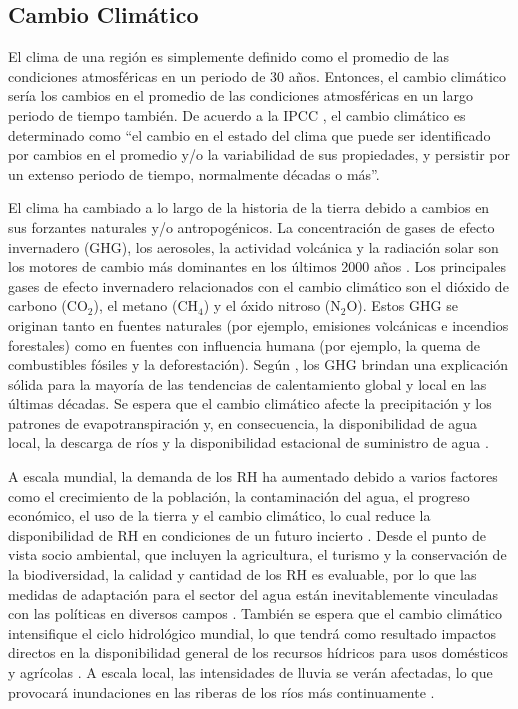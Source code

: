 \documentclass[12pt]{article}
\begin{document}
\subsection{Cambio Climático}

El clima de una región es simplemente definido como el promedio de las condiciones atmosféricas en un periodo de 30 años. Entonces, el cambio climático sería los cambios en el promedio de las condiciones atmosféricas en un largo periodo de tiempo también. De acuerdo a la IPCC \citep{IPCC2007}, el cambio climático es determinado como ``el cambio en el estado del clima que puede ser identificado por cambios en el promedio y/o la variabilidad de sus propiedades, y persistir por un extenso periodo de tiempo, normalmente décadas o más”.

El clima ha cambiado a lo largo de la historia de la tierra debido a cambios en sus forzantes naturales y/o antropogénicos. La concentración de gases de efecto invernadero (GHG), los aerosoles, la actividad volcánica y la radiación solar son los motores de cambio más dominantes en los últimos 2000 años \citep{NRC2006}. Los principales gases de efecto invernadero relacionados con el cambio climático son el dióxido de carbono (CO$_{2}$), el metano (CH$_{4}$) y el óxido nitroso (N$_{2}$O). Estos GHG se originan tanto en fuentes naturales (por ejemplo, emisiones volcánicas e incendios forestales) como en fuentes con influencia humana (por ejemplo, la quema de combustibles fósiles y la deforestación). Según \citet{Solomon2007}, los GHG brindan una explicación sólida para la mayoría de las tendencias de calentamiento global y local en las últimas décadas. Se espera que el cambio climático afecte la precipitación y los patrones de evapotranspiración \citep{Tsanis2011} y, en consecuencia, la disponibilidad de agua local, la descarga de ríos y la disponibilidad estacional de suministro de agua \citep{Arnell2011}. 

A escala mundial, la demanda de los RH ha aumentado debido a varios factores como el crecimiento de la población, la contaminación del agua, el progreso económico, el uso de la tierra y el cambio climático, lo cual reduce la disponibilidad de RH en condiciones de un futuro incierto \citep{Davies2011}. Desde el punto de vista socio ambiental, que incluyen la agricultura, el turismo y la conservación de la biodiversidad, la calidad y cantidad de los RH es evaluable, por lo que las medidas de adaptación para el sector del agua están inevitablemente vinculadas con las políticas en diversos campos \citep{Field2014}. También se espera que el cambio climático intensifique el ciclo hidrológico mundial, lo que tendrá como resultado impactos directos en la disponibilidad general de los recursos hídricos para usos domésticos y agrícolas \citep{Huntington2006}. A escala local, las intensidades de lluvia se verán afectadas, lo que provocará inundaciones en las riberas de los ríos más continuamente \citep{Wilby2010}.
\end{document}
